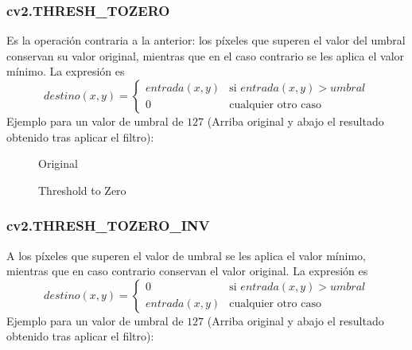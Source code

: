 \subsubsection{cv2.THRESH\_TOZERO}
Es la operación contraria a la anterior: los píxeles que superen el
valor del umbral conservan su valor original, mientras que en el caso
contrario se les aplica el valor mínimo. La expresión es
\begin{equation*}
  destino(x, y) =
  \begin{cases}
    entrada(x, y) & \text{si } entrada(x, y) > umbral \\
    0 & \text{cualquier otro caso}
  \end{cases}
\end{equation*}
Ejemplo para un valor de umbral de $127$ (Arriba original y abajo el
resultado obtenido tras aplicar el filtro):

\begin{figure}[H]
  \caption{Original}
  \centering \setlength\fboxsep{0pt} \setlength\fboxrule{0.5pt}
\end{figure}

\begin{figure}[H]
  \centering \setlength\fboxsep{0pt} \setlength\fboxrule{0.5pt}
  \caption{Threshold to Zero}
\end{figure}

\subsubsection{cv2.THRESH\_TOZERO\_INV}
A los píxeles que superen el valor de umbral se les aplica el valor
mínimo, mientras que en caso contrario conservan el valor original. La
expresión es
\begin{equation*}
  destino(x, y) =
  \begin{cases}
    0  & \text{si } entrada(x, y) > umbral \\
    entrada(x, y) & \text{cualquier otro caso}
  \end{cases}
\end{equation*}
Ejemplo para un valor de umbral de $127$ (Arriba original y abajo el
resultado obtenido tras aplicar el filtro):

